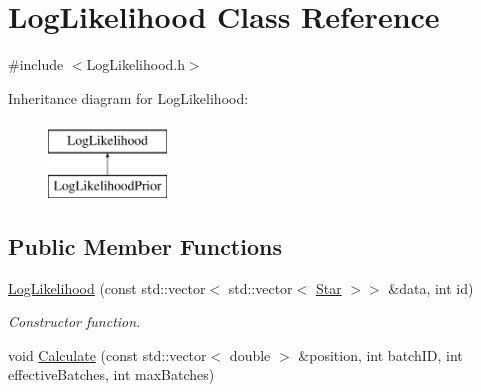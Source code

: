 \hypertarget{classLogLikelihood}{}\section{Log\+Likelihood Class Reference}
\label{classLogLikelihood}


{\ttfamily \#include $<$Log\+Likelihood.\+h$>$}

Inheritance diagram for Log\+Likelihood\+:\begin{figure}[H]
\begin{center}
\leavevmode
\includegraphics[height=2.000000cm]{classLogLikelihood}
\end{center}
\end{figure}
\subsection*{Public Member Functions}
\begin{DoxyCompactItemize}
\item 
\hyperlink{classLogLikelihood_a677cb07d3097385392fe49944e522858}{Log\+Likelihood} (const std\+::vector$<$ std\+::vector$<$ \hyperlink{classStar}{Star} $>$$>$ \&data, int id)
\begin{DoxyCompactList}\small\item\em Constructor function. \end{DoxyCompactList}\item 
void \hyperlink{classLogLikelihood_a748d75e2eb89965246436eb6a9274004}{Calculate} (const std\+::vector$<$ double $>$ \&position, int batch\+ID, int effective\+Batches, int max\+Batches)
\end{DoxyCompactItemize}
